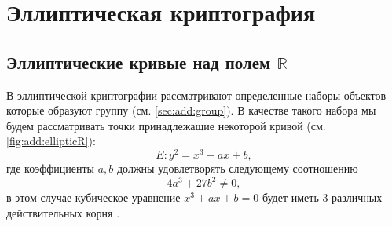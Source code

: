 \section{Эллиптическая криптография}

\subsection{Эллиптические кривые над полем $\mathbb{R}$}



В эллиптической криптографии рассматривают определенные наборы
объектов которые образуют группу (см. \autoref{sec:add:group}). В
качестве такого набора мы будем рассматривать точки принадлежащие
некоторой кривой (см. \autoref{fig:add:ellipticR}): 
\[
E: y^2 = x^3 +a x + b,
\]
где коэффициенты $a,b$ должны удовлетворять следующему соотношению
\[
4 a^3 + 27 b^2 \ne 0,
\]
в этом случае кубическое уравнение $x^3 + a x + b = 0$ будет иметь 3
различных действительных корня \cite{Washington:2008:ECN:1388394}. 




